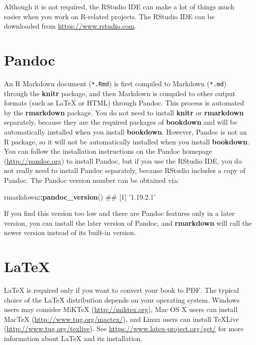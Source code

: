 \documentclass[12pt,]{krantz}
\makeatletter
\newenvironment{Shaded}{\begin{snugshade}}{\end{snugshade}}
\newcommand{\KeywordTok}[1]{\textcolor[rgb]{0.13,0.29,0.53}{\textbf{#1}}}
\newcommand{\OperatorTok}[1]{\textcolor[rgb]{0.81,0.36,0.00}{\textbf{#1}}}
\newcommand{\NormalTok}[1]{#1}
\newenvironment{kframe}{%
\medskip{}
\setlength{\fboxsep}{.8em}
 \def\at@end@of@kframe{}%
 \ifinner\ifhmode%
  \def\at@end@of@kframe{\end{minipage}}%
  \begin{minipage}{\columnwidth}%
 \fi\fi%
 \def\FrameCommand##1{\hskip\@totalleftmargin \hskip-\fboxsep
 \colorbox{shadecolor}{##1}\hskip-\fboxsep
     \hskip-\linewidth \hskip-\@totalleftmargin \hskip\columnwidth}%
 \MakeFramed {\advance\hsize-\width
   \@totalleftmargin\z@ \linewidth\hsize
   \@setminipage}}%
 {\par\unskip\endMakeFramed%
 \at@end@of@kframe}
\renewenvironment{Shaded}{\begin{kframe}}{\end{kframe}}
\theoremstyle{definition}
\theoremstyle{definition}
\theoremstyle{definition}
\theoremstyle{remark}
\makeatother
\begin{document}
Although it is not required, the RStudio IDE can make a lot of things
much easier when you work on R-related projects. The RStudio IDE can be
downloaded from \url{https://www.rstudio.com}.

\section{Pandoc}\label{pandoc}

An R Markdown document (\texttt{*.Rmd}) is first compiled to Markdown
(\texttt{*.md}) through the \textbf{knitr} package, and then Markdown is
compiled to other output formats (such as LaTeX or HTML) through
Pandoc. This process is automated by the
\textbf{rmarkdown} package. You do not need to install \textbf{knitr} or
\textbf{rmarkdown} separately, because they are the required packages of
\textbf{bookdown} and will be automatically installed when you install
\textbf{bookdown}. However, Pandoc is not an R package, so it will not
be automatically installed when you install \textbf{bookdown}. You can
follow the installation instructions on the Pandoc homepage
(\url{http://pandoc.org}) to install Pandoc, but if you use the RStudio
IDE, you do not really need to install Pandoc separately, because
RStudio includes a copy of Pandoc. The Pandoc version number can be
obtained via:

\begin{Shaded}
\begin{Highlighting}[]
\NormalTok{rmarkdown}\OperatorTok{::}\KeywordTok{pandoc_version}\NormalTok{()}
\NormalTok{## [1] '1.19.2.1'}
\end{Highlighting}
\end{Shaded}

If you find this version too low and there are Pandoc features only in a
later version, you can install the later version of Pandoc, and
\textbf{rmarkdown} will call the newer version instead of its built-in
version.

\section{LaTeX}\label{latex}

LaTeX is required only if you want to convert your book to
PDF. The typical choice of the LaTeX distribution depends on your
operating system. Windows users may consider MiKTeX
(\url{http://miktex.org}), Mac OS X users can install MacTeX
(\url{http://www.tug.org/mactex/}), and Linux users can install TeXLive
(\url{http://www.tug.org/texlive}). See
\url{https://www.latex-project.org/get/} for more information about
LaTeX and its installation.
\end{document}

